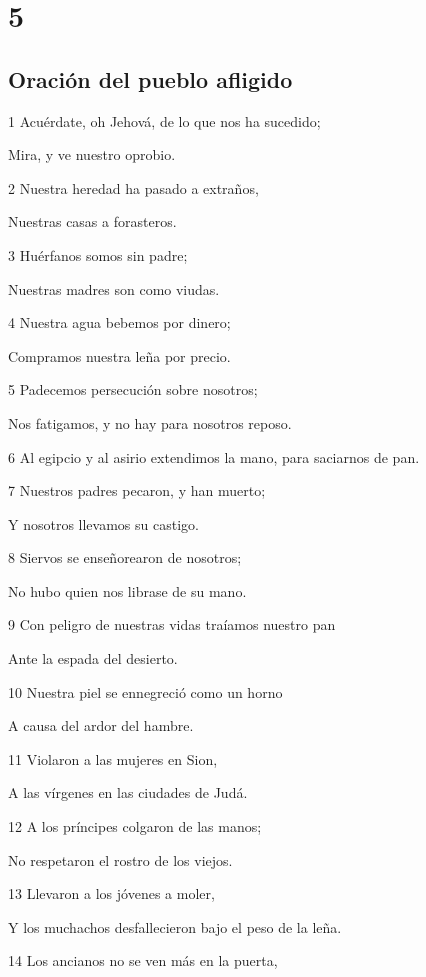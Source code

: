\chapter{5}

\section*{Oración del pueblo afligido}

\par 1 Acuérdate, oh Jehová, de lo que nos ha sucedido;
\par Mira, y ve nuestro oprobio.
\par 2 Nuestra heredad ha pasado a extraños,
\par Nuestras casas a forasteros.
\par 3 Huérfanos somos sin padre;
\par Nuestras madres son como viudas.
\par 4 Nuestra agua bebemos por dinero;
\par Compramos nuestra leña por precio.
\par 5 Padecemos persecución sobre nosotros;
\par Nos fatigamos, y no hay para nosotros reposo.
\par 6 Al egipcio y al asirio extendimos la mano, para saciarnos de pan.
\par 7 Nuestros padres pecaron, y han muerto;
\par Y nosotros llevamos su castigo.
\par 8 Siervos se enseñorearon de nosotros;
\par No hubo quien nos librase de su mano.
\par 9 Con peligro de nuestras vidas traíamos nuestro pan
\par Ante la espada del desierto.
\par 10 Nuestra piel se ennegreció como un horno
\par A causa del ardor del hambre.
\par 11 Violaron a las mujeres en Sion,
\par A las vírgenes en las ciudades de Judá.
\par 12 A los príncipes colgaron de las manos;
\par No respetaron el rostro de los viejos.
\par 13 Llevaron a los jóvenes a moler,
\par Y los muchachos desfallecieron bajo el peso de la leña.
\par 14 Los ancianos no se ven más en la puerta,
